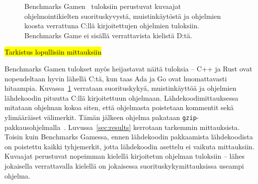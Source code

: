\begin{figure}[ht!]
    \begin{adjustbox}{center}
    \begin{minipage}{1.15\textwidth}
    \begin{minipage}{0.5\textwidth}
        
        \vspace*{-0.8cm}
    \end{minipage}
    \begin{minipage}{0.5\textwidth}
        
        \vspace*{-0.9cm}
    \end{minipage}
    \end{minipage}
    \end{adjustbox}
    \begin{adjustbox}{center}
    \begin{minipage}{1.15\textwidth}
    \begin{adjustbox}{center}
    \begin{minipage}{0.5\textwidth}
        
        \vspace*{-0.8cm}
    \end{minipage}
    \end{adjustbox}
    \end{minipage}
    \end{adjustbox}
    \caption{
        Benchmarks Gamen~\citep[tiedot haettu 10.1.2019]{benchmarks} tuloksiin
        perustuvat kuvaajat ohjelmointikielten suorituskyvystä, muistinkäytöstä
        ja ohjelmien koosta verrattuna C:llä kirjoitettujen ohjelmien
        tuloksiin. Benchmarks Game ei sisällä verrattavista kielistä D:tä.}
    \label{fig:benchmarksgame}
\end{figure}

\hl{Tarkistus lopullisiin mittauksiin}

Benchmarks Gamen tulokset myös heijastavat näitä tuloksia -- C++ ja Rust ovat
nopeudeltaan hyvin lähellä C:tä, kun taas Ada ja Go ovat huomattavasti
hitaampia. Kuvassa~\ref{fig:benchmarksgame} verrataan suorituskykyä,
muistinkäyttöä ja ohjelmien lähdekoodin pituutta C:llä kirjoitettuun ohjelmaan.
Lähdekoodimittauksessa mitataan ohjelman kokoa siten, että ohjelmasta
poistetaan kommentit sekä ylimääräiset välimerkit. Tämän jälkeen ohjelma
pakataan \texttt{gzip}-pakkausohjelmalla~\citep{howmeasured}.
Luvussa~\ref{sec:results} kerrotaan tarkemmin mittauksista. Toisin kuin
Benchmarks Gamessa, ennen lähdekoodin pakkaamista lähdekoodista on poistettu
kaikki tyhjemerkit, jotta lähdekoodin asettelu ei vaikuta mittauksiin. Kuvaajat
perustuvat nopeimman kielellä kirjoitetun ohjelman tuloksiin -- lähes
jokaisella verrattavalla kielellä on jokaisessa suorituskykymittauksissa
useampi ohjelma.

